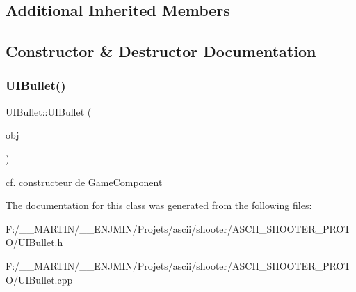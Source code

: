\subsection*{Additional Inherited Members}


\subsection{Constructor \& Destructor Documentation}
\hypertarget{class_u_i_bullet_a5036f0f1649cbb182b46a37ba4096bc1}{}\label{class_u_i_bullet_a5036f0f1649cbb182b46a37ba4096bc1} 
\subsubsection{\texorpdfstring{U\+I\+Bullet()}{UIBullet()}}
{\footnotesize\ttfamily U\+I\+Bullet\+::\+U\+I\+Bullet (\begin{DoxyParamCaption}\item[{\hyperlink{class_game_object}{Game\+Object} $\ast$}]{obj }\end{DoxyParamCaption})}

cf. constructeur de \hyperlink{class_game_component}{Game\+Component} 

The documentation for this class was generated from the following files\+:\begin{DoxyCompactItemize}
\item 
F\+:/\+\_\+\+\_\+\+M\+A\+R\+T\+I\+N/\+\_\+\+\_\+\+E\+N\+J\+M\+I\+N/\+Projets/ascii/shooter/\+A\+S\+C\+I\+I\+\_\+\+S\+H\+O\+O\+T\+E\+R\+\_\+\+P\+R\+O\+T\+O/U\+I\+Bullet.\+h\item 
F\+:/\+\_\+\+\_\+\+M\+A\+R\+T\+I\+N/\+\_\+\+\_\+\+E\+N\+J\+M\+I\+N/\+Projets/ascii/shooter/\+A\+S\+C\+I\+I\+\_\+\+S\+H\+O\+O\+T\+E\+R\+\_\+\+P\+R\+O\+T\+O/U\+I\+Bullet.\+cpp\end{DoxyCompactItemize}
